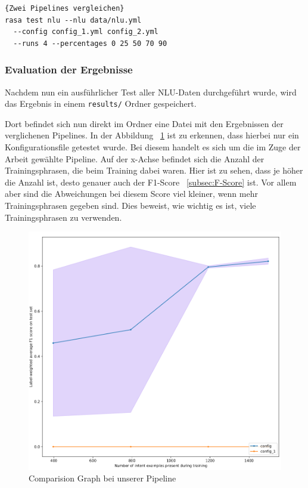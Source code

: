 \begin{lstlisting}[label={lst:comparing-pipelines-custom},caption={Zwei Pipelines vergleichen}]{Zwei Pipelines vergleichen}
rasa test nlu --nlu data/nlu.yml
  --config config_1.yml config_2.yml
  --runs 4 --percentages 0 25 50 70 90
\end{lstlisting}

\subsubsection{Evaluation der Ergebnisse}\label{subsubsec:evaluation-results}

Nachdem nun ein ausführlicher Test aller NLU-Daten durchgeführt wurde, wird das Ergebnis in einem \texttt{results/} Ordner gespeichert.\cite{interpretingTheOutput}

Dort befindet sich nun direkt im Ordner eine Datei mit den Ergebnissen der verglichenen Pipelines.
In der Abbildung ~\ref{fig:comparision_graph} ist zu erkennen, dass hierbei nur ein Konfigurationsfile getestet wurde.
Bei diesem handelt es sich um die im Zuge der Arbeit gewählte Pipeline.
Auf der x-Achse befindet sich die Anzahl der Trainingsphrasen, die beim Training dabei waren.
Hier ist zu sehen, dass je höher die Anzahl ist, desto genauer auch der F1-Score ~\ref{subsec:F-Score} ist.
Vor allem aber sind die Abweichungen bei diesem Score viel kleiner, wenn mehr Trainingsphrasen gegeben sind.
Dies beweist, wie wichtig es ist, viele Trainingsphrasen zu verwenden.

\begin{figure}[hbt!]
    \centering
    \includegraphics[scale=0.4]{pics/comparision_graph}
    \caption{Comparision Graph bei unserer Pipeline}
    \label{fig:comparision_graph}
\end{figure}

